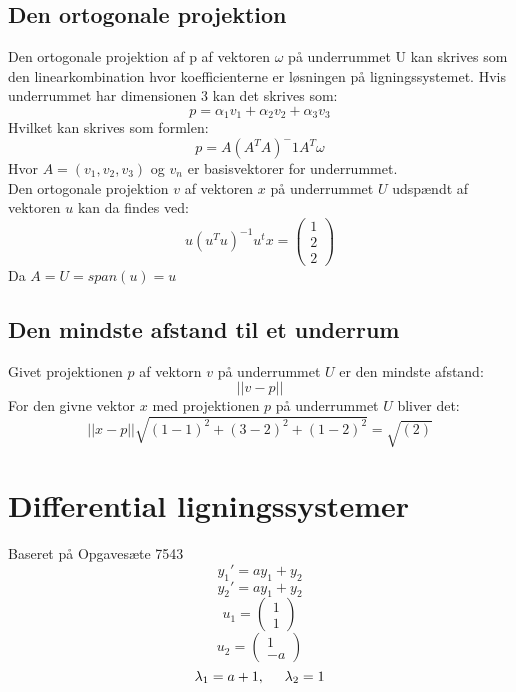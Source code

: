 \documentclass{article}
\begin{document}
\subsection{Den ortogonale projektion}
Den ortogonale projektion af p af vektoren $\omega$ på underrummet U kan 
skrives som den linearkombination hvor koefficienterne er løsningen på 
ligningssystemet. Hvis underrummet har dimensionen 3 kan det skrives som:
$$p=\alpha_1v_1+\alpha_2v_2+\alpha_3v_3$$
Hvilket kan skrives som formlen:
$$p=A(A^TA)^-1A^T\omega$$
Hvor $A=(v_1,v_2,v_3)$ og $v_n$ er basisvektorer for underrummet.\\
Den ortogonale projektion $v$ af vektoren $x$ på underrummet $U$ udspændt af 
vektoren $u$ kan da findes ved:
$$u(u^Tu)^{-1}u^tx=\begin{pmatrix}
1\\2\\2
\end{pmatrix}$$
Da $A=U=span(u)=u$

\subsection{Den mindste afstand til et underrum}
Givet projektionen $p$ af vektorn $v$ på underrummet $U$ er den mindste afstand:
$$||v-p||$$
For den givne vektor $x$ med projektionen $p$ på underrummet $U$ bliver det:
$$||x-p||\sqrt{(1-1)^2+(3-2)^2+(1-2)^2}=\sqrt{(2)}$$
\newpage

\section{Differential ligningssystemer}
{\tiny Baseret på Opgavesæte 7543}
$$y_1'=ay_1+y_2$$
$$y_2'=ay_1+y_2$$
$$u_1=\begin{pmatrix}
1\\1
\end{pmatrix}$$
$$u_2=\begin{pmatrix}
1\\-a
\end{pmatrix}$$
$$\lambda_1 = a+1, \hspace{5mm} \lambda_2=1$$
\end{document}
